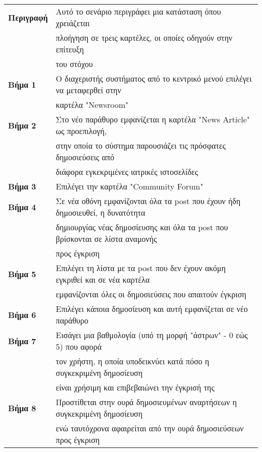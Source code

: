 \documentclass{article}
\newcommand\T{\rule{0pt}{2.6ex}}       %
\newcommand\B{\rule[-1.2ex]{0pt}{0pt}}
\begin{document}
  \begin{center}
     \begin{tabular}{|l|l|}
     \hline
      \textbf{Περιγραφή} & Αυτό το σενάριο περιγράφει μια κατάσταση όπου χρειάζεται \T \\& πλοήγηση σε τρεις καρτέλες, οι οποίες οδηγούν στην επίτευξη \\& του στόχου \B \\ 
      \hline
      \textbf{Βήμα 1} & Ο διαχεριστής συστήματος από το κεντρικό μενού επιλέγει να μεταφερθεί στην \T \\& καρτέλα "Newsroom" \B \\
      \hline
      \textbf{Βήμα 2} & Στο νέο παράθυρο εμφανίζεται η καρτέλα "News Article" ως προεπιλογή, \T \\& στην οποία το σύστημα παρουσιάζει τις πρόσφατες δημοσιεύσεις από \\& διάφορα εγκεκριμένες ιατρικές ιστοσελίδες \B \\
      \hline
      \textbf{Βήμα 3} & Επιλέγει την καρτέλα "Community Forum" \T\B \\
      \hline
      \textbf{Βήμα 4} & Σε νέα οθόνη εμφανίζονται όλα τα post που έχουν ήδη δημοσιευθεί, η δυνατότητα \T \\&  δημιουργίας νέας δημοσίευσης και όλα τα post που βρίσκονται σε λίστα αναμονής \\& προς έγκριση  \B \\
      \hline
      \textbf{Βήμα 5} & Επιλέγει τη λίστα με τα post που δεν έχουν ακόμη εγκριθεί και σε νέα καρτέλα  \T \\& εμφανίζονται όλες οι δημοσιεύσεις που απαιτούν έγκριση\B \\
      \hline
      \textbf{Βήμα 6} & Επιλέγει κάποια δημοσίευση και αυτή εμφανίζεται σε νέο παράθυρο  \T\B \\
      \hline
      \textbf{Βήμα 7} & Εισάγει μια βαθμολογία (υπό τη μορφή "άστρων" - 0 εώς 5) που αφορά \T \\& τον χρήστη, η οποία υποδεικνύει κατά πόσο η συγκεκριμένη δημοσίευση \\& είναι χρήσιμη και επιβεβαιώνει την έγκρισή της \B \\
      \hline
      \textbf{Βήμα 8} & Προστίθεται στην ουρά δημοσιευμένων αναρτήσεων η συγκεκριμένη δημοσίευση \T \\& ενώ ταυτόχρονα αφαιρείται από την ουρά δημοσιεύσεων προς έγκριση \B \\ 
      \hline
     \end{tabular}
 \end{center}
 
\end{document}
